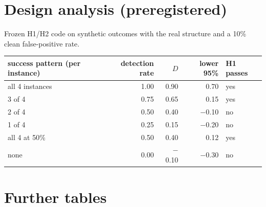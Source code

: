 \documentclass[11pt]{article}
\begin{document}
\section{Design analysis (preregistered)}\label{app:design}
Frozen H1/H2 code on synthetic outcomes with the real structure and a 10\% clean false-positive rate.
\begin{center}\small
\begin{tabular}{lrrrl}
\toprule
success pattern (per instance) & detection rate & $D$ & lower 95\% & H1 passes \\
\midrule
all 4 instances & 1.00 & 0.90 & 0.70 & yes \\
3 of 4 & 0.75 & 0.65 & 0.15 & yes \\
2 of 4 & 0.50 & 0.40 & $-$0.10 & no \\
1 of 4 & 0.25 & 0.15 & $-$0.20 & no \\
all 4 at 50\% & 0.50 & 0.40 & 0.12 & yes \\
none & 0.00 & $-$0.10 & $-$0.30 & no \\
\bottomrule
\end{tabular}
\end{center}

\section{Further tables}\label{app:tables}
\begin{table}[H]\centering\small
\caption{Truth against agreed category, by stage and pooled.}
\resizebox{\linewidth}{!}{}
\end{table}

\begin{table}[H]\centering\small
\caption{The 12 edited runs (exploratory per-run listing). fp: forward-pass calls; cls.: compliance class (N none,
S synthetic-only, I input-layer); \% w: weights changed; bars are the clean-model bars; negative $\Delta$AUPRC means
AUPRC improved.}\label{tab:edited}
\resizebox{\linewidth}{!}{}
\end{table}

{\small
\setlength{\tabcolsep}{4pt}
}
\end{document}
